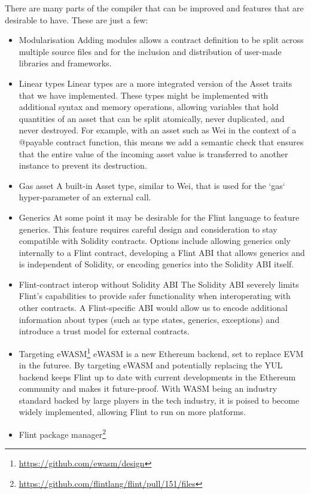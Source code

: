 There are many parts of the compiler that can be improved and features that are desirable to have. These are just a few:

\begin{itemize}
	\item Modularisation
Adding modules allows a contract definition to be split across multiple source files and for the inclusion and distribution of user-made libraries and frameworks.
	\item Linear types
Linear types are a more integrated version of the Asset traits that we have implemented. These types might be implemented with additional syntax and memory operations, allowing variables that hold quantities of an asset that can be split atomically, never duplicated, and never destroyed. For example, with an asset such as Wei in the context of a @payable contract function, this means we add a semantic check that ensures that the entire value of the incoming asset value is transferred to another instance to prevent its destruction.
	\item Gas asset
A built-in Asset type, similar to Wei, that is used for the `gas` hyper-parameter of an external call.
	\item Generics
At some point it may be desirable for the Flint language to feature generics. This feature requires careful design and consideration to stay compatible with Solidity contracts. Options include allowing generics only internally to a Flint contract, developing a Flint ABI that allows generics and is independent of Solidity, or encoding generics into the Solidity ABI itself.
	\item Flint-contract interop without Solidity ABI
The Solidity ABI severely limits Flint's capabilities to provide safer functionality when interoperating with other contracts. A Flint-specific ABI would allow us to encode additional information about types (such as type states, generics, exceptions) and introduce a trust model for external contracts.
	\item Targeting eWASM\footnote{\url{https://github.com/ewasm/design}}
eWASM is a new Ethereum backend, set to replace EVM in the futuree. By targeting eWASM and potentially replacing the YUL backend keeps Flint up to date with current developments in the Ethereum community and makes it future-proof. With WASM being an industry standard backed by large players in the tech industry, it is poised to become widely implemented, allowing Flint to run on more platforms.
	\item Flint package manager\footnote{\url{https://github.com/flintlang/flint/pull/151/files}}

\end{itemize}
